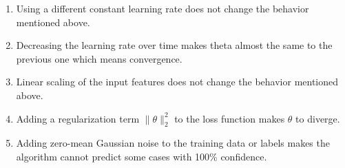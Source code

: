 \begin{answer}
\begin{enumerate}
  \item Using a different constant learning rate does not change the behavior mentioned above.
  \item Decreasing the learning rate over time makes theta almost the same to the previous one which means convergence.
  \item Linear scaling of the input features does not change the behavior mentioned above.
  \item Adding a regularization term $\|\theta\|_2^2$ to the loss function makes $\theta$ to diverge.
  \item Adding zero-mean Gaussian noise to the training data or labels makes the algorithm cannot predict some cases with 100\% confidence.
\end{enumerate}
\end{answer}
